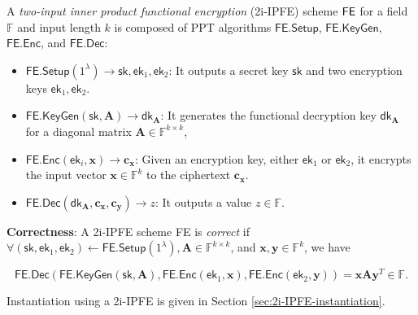 \begin{definition}
\label{def:2i-IPFE}
	A \emph{two-input inner product functional encryption} (2i-IPFE) scheme $\sf FE$ for a field $\mathbb{F}$ and input length $k$ is composed of PPT algorithms $\textsf{FE.Setup}$, $\textsf{FE.KeyGen}$, $\textsf{FE.Enc}$, and $\textsf{FE.Dec}$:

	\begin{itemize}
	
		\item $\textsf{FE.Setup}(1^\lambda) \to \textsf{sk}, \textsf{ek}_1, \textsf{ek}_2$: It outputs a secret key $\textsf{sk}$ and two encryption keys $\textsf{ek}_1, \textsf{ek}_2$.
	
		\item $\textsf{FE.KeyGen}(\textsf{sk}, \mathbf{A}) \to \textsf{dk}_\mathbf{A}$: It generates the functional decryption key $\textsf{dk}_\mathbf{A}$ for a diagonal matrix $\mathbf{A} \in \mathbb{F}^{k \times k}$,  
	
		\item $\textsf{FE.Enc}(\textsf{ek}_i, \mathbf{x}) \to \mathbf{c_x}$: Given an encryption key, either $\textsf{ek}_1$ or $\textsf{ek}_2$, it encrypts the input vector $\mathbf{x} \in \mathbb{F}^k$ to the ciphertext $\mathbf{c_x}$. 
	
		\item $\textsf{FE.Dec}(\textsf{dk}_\mathbf{A}, \mathbf{c_x}, \mathbf{c_y}) \to z$: It outputs a value $z \in \mathbb{F}$.
	
	\end{itemize}
	
	\noindent \textbf{Correctness}: A 2i-IPFE scheme \textsf{FE} is \emph{correct} if $\forall (\textsf{sk}, \textsf{ek}_1, \textsf{ek}_2) \gets \textsf{FE.Setup}(1^\lambda), \mathbf{A} \in \mathbb{F}^{k \times k}$, and $\mathbf{x}, \mathbf{y} \in \mathbb{F}^k$, we have

	\[
		\textsf{FE.Dec}(\textsf{FE.KeyGen}(\textsf{sk},  \mathbf{A}), \textsf{FE.Enc}(\textsf{ek}_1, \mathbf{x}), \textsf{FE.Enc}(\textsf{ek}_2, \mathbf{y}) ) = \mathbf{x} \mathbf{A} \mathbf{y}^T \in \mathbb{F}.
	\]

\end{definition}

Instantiation using a 2i-IPFE is given in Section \ref{sec:2i-IPFE-instantiation}.

